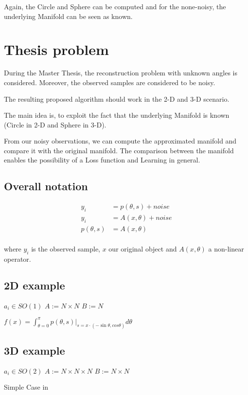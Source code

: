 Again, the Circle and Sphere can be computed and for the none-noisy, the underlying Manifold can be seen as known.


\section{Thesis problem}
During the Master Thesis, the reconstruction problem with unknown angles is considered. 
Moreover, the observed samples are considered to be noisy. 

The resulting proposed algorithm should work in the 2-D and 3-D scenario.

The main idea is, to exploit the fact that the underlying Manifold is known (Circle in 2-D and Sphere in 3-D). 

From our noisy observations, we can compute the approximated manifold and compare it with the original manifold.
The comparison between the manifold enables the possibility of a Loss function and Learning in general.




\subsection{Overall notation}

\begin{equation}
    \begin{aligned}
        y_i &= p(\theta, s) + noise \\
        y_i &= A(x, \theta) + noise \\
        p(\theta, s) &= A(x, \theta) \\
    \end{aligned}
\end{equation}

where $y_i$ is the observed sample, $x$ our original object and $A(x, \theta)$ a non-linear operator.



\subsection{2D example}

$a_i \in SO(1)$
$A := N \times N$
$B := N$

$f(x) = \int_{\theta = 0}^{\pi} p(\theta, s) |_{s=x \cdot (- \sin \theta, cos \theta) } d \theta$



\subsection{3D example}

$a_i \in SO(2)$
$A := N \times N \times N$
$B := N \times N$


Simple Case in 
